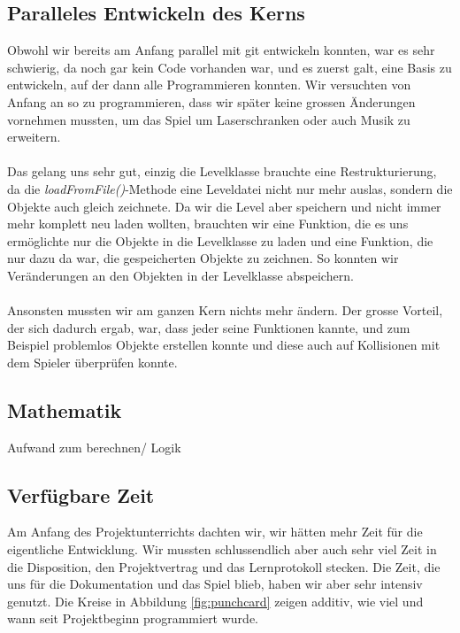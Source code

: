 \documentclass[12pt,a4paper]{scrartcl}
\begin{document}
\subsection{Paralleles Entwickeln des Kerns}
Obwohl wir bereits am Anfang parallel mit git entwickeln konnten, war es sehr schwierig, da noch gar kein Code vorhanden war,
und es zuerst galt, eine Basis zu entwickeln, auf der dann alle Programmieren konnten. Wir versuchten von Anfang an so zu programmieren,
dass wir später keine grossen Änderungen vornehmen mussten, um das Spiel um Laserschranken oder auch Musik zu erweitern.
\\
\\
Das gelang uns sehr gut, einzig die Levelklasse brauchte eine Restrukturierung, da die \textit{loadFromFile()}-Methode eine Leveldatei nicht nur mehr auslas,
sondern die Objekte auch gleich zeichnete. Da wir die Level aber speichern und nicht immer mehr komplett neu laden wollten, brauchten wir eine
Funktion, die es uns ermöglichte nur die Objekte in die Levelklasse zu laden und eine Funktion, die nur dazu da war, die gespeicherten Objekte zu zeichnen. So konnten wir Veränderungen an den Objekten in der Levelklasse abspeichern.
\\
\\
Ansonsten mussten wir am ganzen Kern nichts mehr ändern. Der grosse Vorteil, der sich dadurch ergab, war, dass jeder seine 
Funktionen kannte, und zum Beispiel problemlos Objekte erstellen konnte und diese auch auf Kollisionen mit dem Spieler überprüfen konnte.

\subsection{Mathematik}
Aufwand zum berechnen/ Logik

\subsection{Verfügbare Zeit}
Am Anfang des Projektunterrichts dachten wir, wir hätten mehr Zeit für die eigentliche Entwicklung. Wir mussten schlussendlich aber auch
sehr viel Zeit in die Disposition, den Projektvertrag und das Lernprotokoll stecken. Die Zeit, die uns für die Dokumentation und das Spiel
blieb, haben wir aber sehr intensiv genutzt. Die Kreise in Abbildung \ref{fig:punchcard} zeigen additiv, wie viel und wann seit Projektbeginn programmiert wurde.
\end{document}
